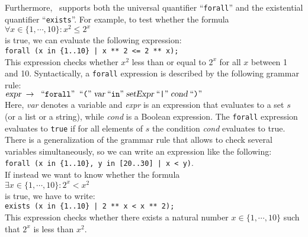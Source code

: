 Furthermore, \setlx\ supports both the universal quantifier ``\texttt{forall}'' and the
existential quantifier ``\texttt{exists}''.  For example, to test whether the formula
\\[0.2cm]
\hspace*{1.3cm}
$\forall x \in \{ 1, \cdots, 10 \}: x^2 \leq 2^x$
\\[0.2cm]
is true, we can evaluate the following expression:
\\[0.2cm]
\hspace*{1.3cm}
\texttt{forall (x in \{1..10\} | x ** 2 <= 2 ** x);}
\\[0.2cm]
This expression checks whether $x^2$ less than or equal to $2^x$ for all $x$ between 1 and
10.  Syntactically, a \texttt{forall} expression is described by the following grammar
rule: 
\\[0.2cm]
\hspace*{1.3cm}
$\textsl{expr} \;\rightarrow\; \;\mbox{``\texttt{forall}''}\; \;\mbox{``\texttt{(}''}\; \textsl{var} \;\mbox{``\texttt{in}''}\;
 \textsl{setExpr} \;\mbox{``\texttt{|}''}\; \textsl{cond} \;\mbox{``\texttt{)}''}\;
$
\\[0.2cm]
Here, \textsl{var} denotes a variable and \textsl{expr} is an expression that evaluates
to a set $s$ (or a list  or a string), while \textsl{cond} is a Boolean expression.  The
\texttt{forall} expression evaluates to \texttt{true} if for all elements of $s$ the
condition \textsl{cond} evaluates to true.  There is a generalization of the grammar rule 
that allows to check several variables simultaneously, so we can write an expression like
the following:
\\[0.2cm]
\hspace*{1.3cm}
\texttt{forall (x in \{1..10\}, y in [20..30] | x < y)}.
\\[0.2cm]
If instead we want to know whether the formula
\\[0.2cm]
\hspace*{1.3cm}
$\exists x \in \{ 1, \cdots, 10 \}: 2^x < x^2$
\\[0.2cm]
is true, we have to write:
\\[0.2cm]
\hspace*{1.3cm}
\texttt{exists (x in \{1..10\} | 2 ** x < x ** 2);}
\\[0.2cm]
This expression checks whether there exists a natural number $x \in \{1, \cdots, 10\}$
such that $2^x$ is less than $x^2$.
\vspace*{0.3cm}

